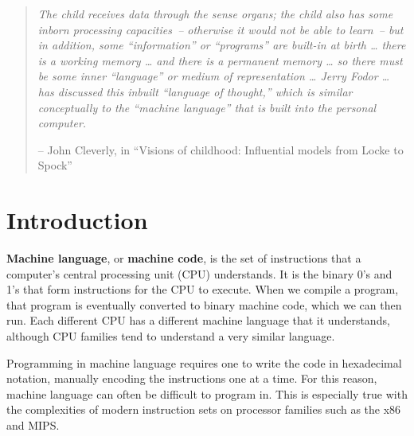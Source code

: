 \lstset{frameround=fttt,captionpos=b}

\begin{quotation} {\em 
\noindent
The child receives data through the sense organs; the child also has
some inborn processing capacities~-- otherwise it would not be able
to learn~-- but in addition, some ``information'' or ``programs'' are
built-in at birth
\ldots
there is a working memory
\ldots
and there is a permanent memory
\ldots
so there must be some inner ``language'' or medium of representation
\ldots 
Jerry Fodor
\ldots
has discussed this inbuilt ``language of thought,'' which is similar
conceptually to the ``machine language'' that is built into the
personal computer.
}

-- John Cleverly, in ``Visions of childhood: Influential models from
Locke to Spock'' \cite{cleverley1986visions}
\end{quotation}


\section{Introduction}

{\bf Machine language}, or {\bf machine code}, is the set of
instructions that a computer's central processing unit (CPU)
understands.  It is the binary 0's and 1's that form instructions for
the CPU to execute.  When we compile a program, that program is
eventually converted to binary machine code, which we can then run.
Each different CPU has a different machine language that it
understands, although CPU families tend to understand a very similar
language.

Programming in machine language requires one to write the code in
hexadecimal notation, manually encoding the instructions one at a
time.  For this reason, machine language can often be difficult to
program in.  This is especially true with the complexities of modern
instruction sets on processor families such as the x86 and MIPS.

